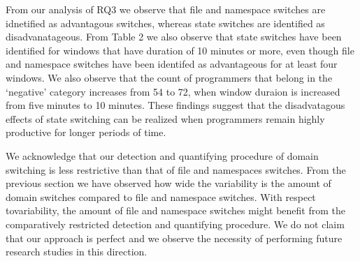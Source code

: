 \begin{itemize}
\begin{item}
\end{item}

\begin{item}

From our analysis of RQ3 we observe that file and namespace switches 
are idnetified as advantagous switches, whereas state switches are identified as disadvanatageous. From Table 2 we also observe that state switches have been identified for windows that have duration of 10 minutes or more, even though file and namespace switches have been identifed as advantageous for at least four windows. We also observe that the count of programmers that belong in the `negative' category increases from 54 to 72, when window duraion is increased from five minutes to 10 minutes. These findings suggest that the disadvatagous effects of state switching can be realized when programmers 
remain highly productive for longer periods of time.        
       
     
\end{item}

\begin{item}
We acknowledge that our detection and quantifying procedure of domain switching is less restrictive than that of file and namespaces switches. From the previous section we have observed how wide the variability is the amount of domain switches compared to file and namespace switches. With respect tovariability, the amount of file and namespace switches might benefit from the comparatively restricted detection and quantifying procedure. We do not claim that our approach is perfect and we observe the necessity of performing future research studies in this direction.                   
       
     
\end{item}



\begin{item}


\end{item}
\end{itemize}
